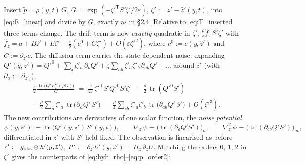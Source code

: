 \documentclass[11pt,a4paper]{article}
\newcommand{\tr}{\operatorname{tr}}
\newcommand{\T}{^{\mathsf T}}
\newcommand{\zh}{\hat{z}}
\newcommand{\eps}{\varepsilon}
\theoremstyle{plain}
\theoremstyle{definition}
\theoremstyle{remark}
\begin{document}
Insert $\tilde p = \rho(y,t)\,G$, $G=\exp(-{\zeta'}\T S'\zeta'/2\eps)$, $\zeta' := z'-\zh'(y,t)$, into \eqref{eq:E_linear} and divide by $G$, exactly as in \S2.4. Relative to \eqref{eq:T_inserted} three terms change. The drift term is now \emph{exactly} quadratic in $\zeta'$, $\tfrac\rho\eps\hat f_z\T S'\zeta'$ with $\hat f_z = a+B\zh' + B\zeta' - \tfrac\eps2(c^0 + C\zeta') + O(\eps{\zeta'}^2)$, where $c^0 := c(y,\zh')$ and $C := \partial_{z'}c$. The diffusion term carries the state-dependent noise: expanding $Q'(y,z') = {Q'}^0 + \sum_a\zeta'_a\,\partial_aQ' + \tfrac12\sum_{ab}\zeta'_a\zeta'_b\,\partial_{ab}Q' + \dots$ around $\zh'$ (with $\partial_a := \partial_{z'_a}$),
\begin{multline*}
  \frac\eps2\,\frac{\tr\big(Q'\nabla_{z'}^2(\rho G)\big)}{G}
  \;=\; \frac{\rho}{2\eps}\,{\zeta'}\T S'{Q'}^0S'\zeta' \;-\; \frac\rho2\,\tr({Q'}^0S') \\
  -\; \frac\rho2\sum_a\zeta'_a\,\tr\big(\partial_aQ'\,S'\big) \;-\; \frac\rho4\sum_{ab}\zeta'_a\zeta'_b\,\tr\big(\partial_{ab}Q'\,S'\big) + O({\zeta'}^3).
\end{multline*}
The new contributions are derivatives of one scalar function, the \emph{noise potential}
\begin{equation}
  \psi(y,z') := \tr\big(Q'(y,z')\,S'(y,t)\big), \qquad \nabla_{z'}\psi = \big(\tr(\partial_aQ'S')\big)_a, \qquad \nabla_{z'}^2\psi = \big(\tr(\partial_{ab}Q'S')\big)_{ab},
  \label{eq:E_psi}
\end{equation}
differentiated in $z'$ with $S'$ held fixed. The observation is linearised as before, $r' := y_{\rm obs}\ominus h'(y,\zh')$, $H' := \partial_{z'}h'(y,\zh') = H_z\,\partial_zU$. Matching the orders $0$, $1$, $2$ in $\zeta'$ gives the counterparts of \eqref{eq:hyb_rho}--\eqref{eq:p_order2}:
\end{document}
